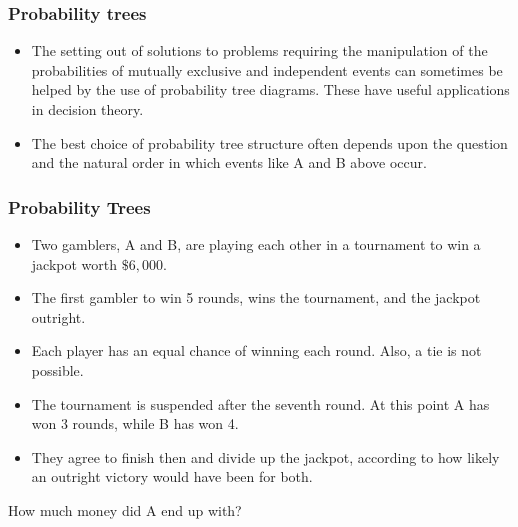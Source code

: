 \documentclass[IntroMain.tex]{subfiles}
\begin{document}
	
\begin{frame}
\frametitle{Probability trees}
\begin{itemize}
\item The setting out of solutions to problems requiring the manipulation of the probabilities of mutually exclusive and independent events can sometimes be helped by the use of probability tree diagrams. These have useful applications in decision theory.

\item The best choice of probability tree structure often depends upon the question and the natural order in which events like A and B above occur.
\end{itemize}

\end{frame}
\begin{frame}
\frametitle{Probability Trees}
{
\large
\vspace{-0.3cm}
\begin{itemize}
\item Two gamblers, A and B, are playing each other in a tournament to win a jackpot worth $\$6,000$. 
\item The first gambler to win 5 rounds, wins the tournament, and the jackpot outright.
\item Each player has an equal chance of winning each round. Also, a tie is not possible.
\item The tournament is suspended after the seventh round. At this point A has won 3 rounds, while B has won 4.
\item They agree to finish then and divide up the jackpot, according to how likely an outright victory would have been for both.
\end{itemize}
How much money did A end up with?
}
\end{frame}
\end{document}
